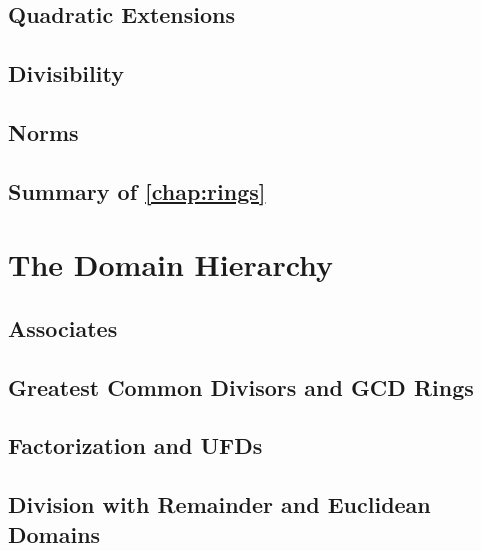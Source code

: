 \documentclass{memoir}
\begin{document}
    \section{Quadratic Extensions}
      \label{sec:quad-ext}
      
      \newpage

    \section{Divisibility}
      \label{sec:divisibility}
      
      \newpage

    \section{Norms}
      \label{sec:norms}
      
      \newpage

    \section*{Summary of \autoref{chap:rings}}
      


  \chapter{The Domain Hierarchy}
    \label{chap:domains}
    
    \newpage

    \section{Associates}
      \label{sec:associates}
      
      \newpage

    \section{Greatest Common Divisors and GCD Rings}
      \label{sec:gcd-rings}
      
      \newpage

    \section{Factorization and UFDs}
      \label{sec:ufds}
      
      \newpage

    \section{Division with Remainder and Euclidean Domains}
      \label{sec:eds}
      
      \newpage
\end{document}
